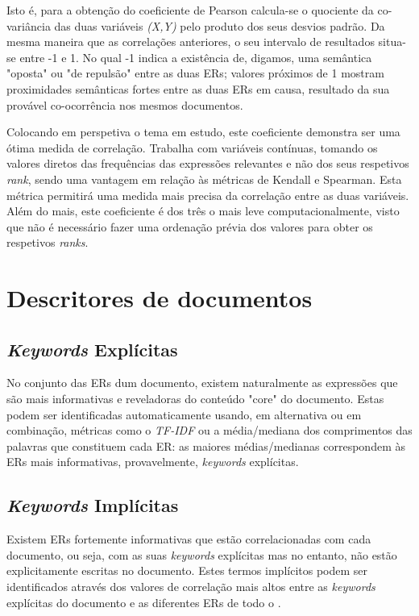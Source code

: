 Isto é, para a obtenção do coeficiente de Pearson calcula-se o quociente da co-variância das duas variáveis \textit{(X,Y)} pelo produto dos seus desvios padrão. Da mesma maneira que as correlações anteriores, o seu intervalo de resultados situa-se entre -1 e 1. No qual -1 indica a existência de, digamos, uma semântica "oposta" ou "de repulsão" \thinspace entre as duas ERs; valores próximos de 1 mostram proximidades semânticas fortes entre  as duas ERs em causa, resultado da sua provável co-ocorrência nos mesmos documentos.

Colocando em perspetiva o tema em estudo, este coeficiente demonstra ser uma ótima medida de correlação. Trabalha com variáveis contínuas, tomando os valores diretos das frequências das expressões relevantes e não dos seus respetivos \textit{rank}, sendo uma vantagem em relação às métricas de Kendall e Spearman. Esta métrica permitirá uma medida mais precisa da correlação entre as duas variáveis. Além do mais, este coeficiente é dos três o mais leve computacionalmente, visto que não é necessário fazer uma ordenação prévia dos valores para obter os respetivos \textit{ranks}.

\section{Descritores de documentos}

\subsection{\textit{Keywords} Explícitas}
No conjunto das ERs dum documento, existem naturalmente as expressões que são mais informativas e reveladoras do conteúdo "core" \thinspace do documento. Estas podem ser identificadas automaticamente usando, em alternativa ou em combinação, métricas como o \textit{TF-IDF} ou a média/mediana dos comprimentos das palavras que constituem cada ER: as maiores médias/medianas correspondem às ERs mais informativas, provavelmente, \textit{keywords} explícitas. 

\subsection{\textit{Keywords} Implícitas}
Existem ERs fortemente informativas que estão correlacionadas com cada documento, ou seja, com as suas \textit{keywords} explícitas mas no entanto, não estão explicitamente escritas no documento. Estes termos implícitos podem ser identificados através dos valores de correlação mais altos entre as \textit{keywords} explícitas do documento e as diferentes ERs de todo o .

